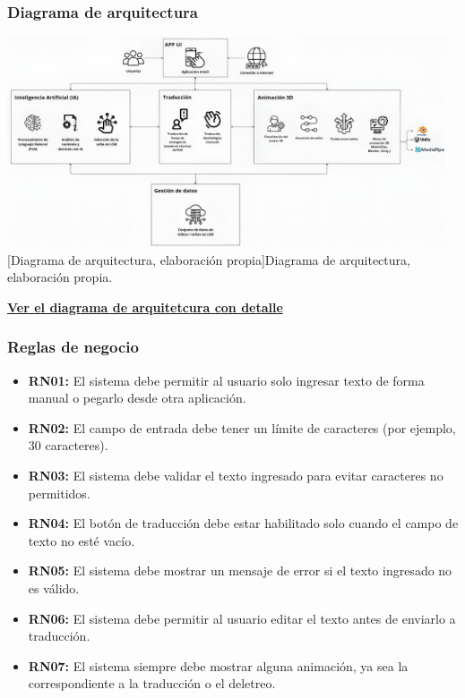 \subsubsection{Diagrama de arquitectura}
\begin{center}
	\includegraphics[width=0.97\textwidth]{Images/Cap 3/Arquitectura_Grande.jpg}
	[Diagrama de arquitectura, elaboración propia]{Diagrama de arquitectura, elaboración propia.}  %
\end{center}

 \begin{flushleft} \href{https://miro.com/app/board/uXjVI24dV0c=/?share_link_id=690276332577}{\textbf{Ver el diagrama de arquitetcura con detalle}} \end{flushleft}

\subsubsection{Reglas de negocio}
\begin{itemize}[leftmargin=1.5cm]
    \item \textbf{RN01:} El sistema debe permitir al usuario solo ingresar texto de forma manual o pegarlo desde otra aplicación.
    \item \textbf{RN02:} El campo de entrada debe tener un límite de caracteres (por ejemplo, 30 caracteres).
    \item \textbf{RN03:} El sistema debe validar el texto ingresado para evitar caracteres no permitidos.
    \item \textbf{RN04:} El botón de traducción debe estar habilitado solo cuando el campo de texto no esté vacío.
    \item \textbf{RN05:} El sistema debe mostrar un mensaje de error si el texto ingresado no es válido.
    \item \textbf{RN06:} El sistema debe permitir al usuario editar el texto antes de enviarlo a traducción.
	\item \textbf{RN07:} El sistema siempre debe mostrar alguna animación, ya sea la correspondiente a la traducción o el deletreo.
\end{itemize}
